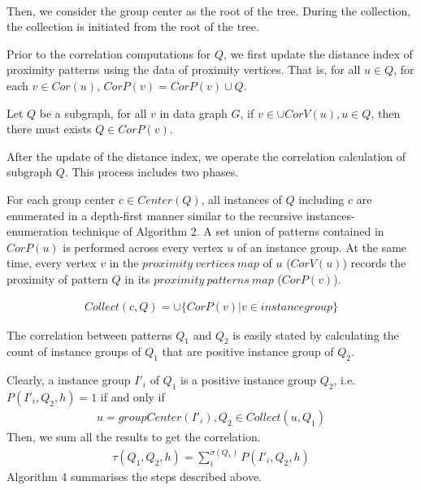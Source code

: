~\newline
~\newline

%
Then, we consider the group center as the root of the tree. During the collection, the collection is initiated from the root of the tree.


\par Prior to the correlation computations for $Q$, we first update the distance index of proximity patterns using the data of proximity vertices. That is, for all $u\in Q$, for each $v\in Cor(u)$, $CorP(v)=CorP(v)\cup Q$.
\begin{lma}
	\label{lemma:distance bidirection relation between vertices and patterns}
	Let $Q$ be a subgraph, for all $v$ in data graph $G$, if $v\in \cup CorV(u),u\in Q$, then there must exists $Q\in CorP(v)$.
\end{lma}
\par After the update of the distance index, we operate the correlation calculation of subgraph $Q$. This process includes two phases.

 For each group center $c\in Center(Q)$, all instances of $Q$ including $c$ are enumerated in a depth-first manner similar to the recursive instances-enumeration technique of Algorithm 2. A set union of patterns contained in $CorP(u)$ is performed across every vertex $u$ of an instance group. At the same time, every vertex $v$ in the $proximity\ vertices\ map$ of $u$ ($CorV(u)$) records the proximity of pattern $Q$ in its $proximity\ patterns\ map$ ($CorP(v)$).

\begin{align}
	Collect(c,Q)=\cup \{CorP(v)|v\in instance group\}
\end{align}

 The correlation between patterns $Q_1$ and $Q_2$ is easily stated by calculating the count of instance groups of $Q_1$ that are positive instance group of $Q_2$.
\par Clearly, a instance group $I'_i$ of $Q_1$ is a positive instance group $Q_2$, i.e. $P(I'_i,Q_2,h)=1$ if and only if
\begin{align}
	u=groupCenter(I'_i), Q_2\in Collect(u,Q_1)
\end{align}
Then, we sum all the results to get the correlation.
\begin{align}
	\tau(Q_1,Q_2,h)=\sum_i^{\sigma(Q_1)} P(I'_i,Q_2,h)
\end{align}
Algorithm 4 summarises the steps described above.

